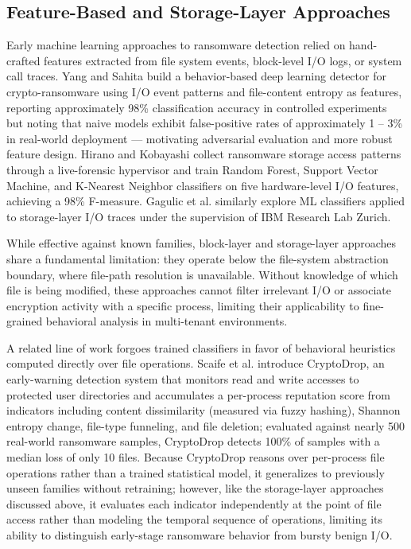 \subsection{Feature-Based and Storage-Layer Approaches}\label{sec:2.3.1}

Early machine learning approaches to ransomware detection relied on hand-crafted features extracted from file system events, block-level I/\allowbreak{}O logs, or system call traces. Yang and Sahita \cite{ref29} build a behavior-based deep learning detector for crypto-ransomware using I/\allowbreak{}O event patterns and file-content entropy as features, reporting approximately 98\% classification accuracy in controlled experiments but noting that naive models exhibit false-positive rates of approximately 1 -- 3\% in real-world deployment --- motivating adversarial evaluation and more robust feature design. Hirano and Kobayashi \cite{ref26} collect ransomware storage access patterns through a live-forensic hypervisor and train Random Forest, Support Vector Machine, and K-Nearest Neighbor classifiers on five hardware-level I/\allowbreak{}O features, achieving a 98\% F-measure. Gagulic et al. \cite{ref25} similarly explore ML classifiers applied to storage-layer I/\allowbreak{}O traces under the supervision of IBM Research Lab Zurich.

While effective against known families, block-layer and storage-layer approaches share a fundamental limitation: they operate below the file-system abstraction boundary, where file-path resolution is unavailable. Without knowledge of which file is being modified, these approaches cannot filter irrelevant I/\allowbreak{}O or associate encryption activity with a specific process, limiting their applicability to fine-grained behavioral analysis in multi-tenant environments.

A related line of work forgoes trained classifiers in favor of behavioral heuristics computed directly over file operations. Scaife et al. \cite{ref51} introduce CryptoDrop, an early-warning detection system that monitors read and write accesses to protected user directories and accumulates a per-process reputation score from indicators including content dissimilarity (measured via fuzzy hashing), Shannon entropy change, file-type funneling, and file deletion; evaluated against nearly 500 real-world ransomware samples, CryptoDrop detects 100\% of samples with a median loss of only 10 files. Because CryptoDrop reasons over per-process file operations rather than a trained statistical model, it generalizes to previously unseen families without retraining; however, like the storage-layer approaches discussed above, it evaluates each indicator independently at the point of file access rather than modeling the temporal sequence of operations, limiting its ability to distinguish early-stage ransomware behavior from bursty benign I/\allowbreak{}O.

